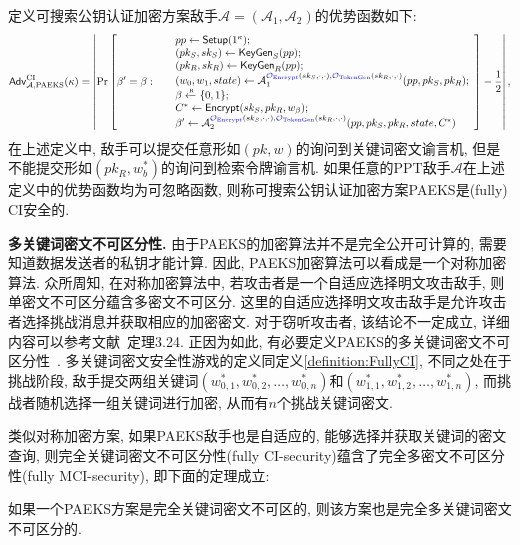 \begin{definition}[关键词密文不可区分安全性]\label{definition:FullyCI}
定义可搜索公钥认证加密方案敌手$\mathcal{A} = (\mathcal{A}_1, \mathcal{A}_2)$的优势函数如下:
\begin{displaymath}
\mathsf{Adv}_{\mathcal{A}, \text{PAEKS}}^{\text{CI}}(\kappa) = \left| \Pr \left[\beta' = \beta:~
\begin{array}{ll}
	& pp \leftarrow \mathsf{Setup}(1^\kappa); \\		
	& (pk_S, sk_S) \leftarrow \mathsf{KeyGen}_S(pp);\\
	& (pk_R, sk_R) \leftarrow \mathsf{KeyGen}_R(pp);\\
	& (w_0, w_1, state) \leftarrow \mathcal{A}_1^{{\color{blue} \mathcal{O}_{\text{Encrypt}}}(sk_S,\cdot, \cdot), {\color{blue} \mathcal{O}_{\text{TokenGen}}}(sk_R,\cdot, \cdot)}(pp, pk_S, pk_R); \\
	& \beta \xleftarrow{\textup{\tiny R}} \{0, 1\}; \\
	& C^* \leftarrow \mathsf{Encrypt}(sk_S, pk_R, w_\beta); \\
	& \beta' \leftarrow \mathcal{A}_2^{{\color{blue} \mathcal{O}_{\text{Encrypt}}}(sk_S,\cdot, \cdot), {\color{blue} \mathcal{O}_{\text{TokenGen}}}(sk_R,\cdot, \cdot)}(pp, pk_S, pk_R, state, C^*)
	\end{array} 
\right] - \frac{1}{2} \right|,
\end{displaymath}
在上述定义中, 敌手可以提交任意形如$(pk, w)$的询问到关键词密文谕言机, 但是不能提交形如$(pk_R, w_b^*)$的询问到检索令牌谕言机. 如果任意的PPT敌手$\mathcal{A}$在上述定义中的优势函数均为可忽略函数, 则称可搜索公钥认证加密方案PAEKS是(fully) CI安全的.
\end{definition} 

\medskip\noindent\textbf{多关键词密文不可区分性.} 由于PAEKS的加密算法并不是完全公开可计算的, 需要知道数据发送者的私钥才能计算. 因此, PAEKS加密算法可以看成是一个对称加密算法. 众所周知, 在对称加密算法中, 若攻击者是一个自适应选择明文攻击敌手, 则单密文不可区分蕴含多密文不可区分. 这里的自适应选择明文攻击敌手是允许攻击者选择挑战消息并获取相应的加密密文. 对于窃听攻击者, 该结论不一定成立, 详细内容可以参考文献~\cite{KL-Cryptography-2007}定理3.24. 正因为如此, 有必要定义PAEKS的多关键词密文不可区分性~\cite{Qin-Information-Science-2020}. 多关键词密文安全性游戏的定义同定义\ref{definition:FullyCI}, 不同之处在于挑战阶段, 敌手提交两组关键词$(w_{0,1}^*, w_{0,2}^*,\ldots, w_{0,n}^*)$和$(w_{1,1}^*, w_{1,2}^*,\ldots, w_{1,n}^*)$, 而挑战者随机选择一组关键词进行加密, 从而有$n$个挑战关键词密文. 

类似对称加密方案, 如果PAEKS敌手也是自适应的, 能够选择并获取关键词的密文查询, 则完全关键词密文不可区分性(fully CI-security)蕴含了完全多密文不可区分性(fully MCI-security), 即下面的定理成立:
\begin{theorem}\label{thm:relation}
如果一个PAEKS方案是完全关键词密文不可区的, 则该方案也是完全多关键词密文不可区分的. 
\end{theorem}

